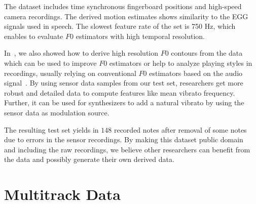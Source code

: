 \par
The dataset includes time synchronous fingerboard positions and high-speed camera recordings. 
The derived motion estimates shows similarity to the EGG signals used in speech. 
The slowest feature rate of the set is 750 Hz, which enables to evaluate $F0$ estimators with high temporal resolution. 
\par
In~\cite{stoeter15acm}, we also showed how to derive high resolution $F0$ contours from the data which can be used to improve $F0$ estimators or help to analyze playing styles in recordings, usually relying on conventional $F0$ estimators based on the audio signal~\cite{mellody2000time}. 
By using sensor data samples from our test set, researchers get more robust and detailed data to compute features like mean vibrato frequency. 
Further, it can be used for synthesizers to add a natural vibrato by using the sensor data as modulation source.
\par
The resulting test set yields in $148$ recorded notes after removal of some notes due to errors in the sensor recordings.
By making this dataset public domain~\cite{oss_muserc} and including the raw recordings, we believe other researchers can benefit from the data and possibly generate their own derived data.

\section{Multitrack Data}


